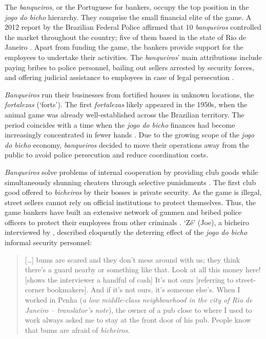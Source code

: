 \documentclass[a4paper,12pt]{article}
\begin{document}
The \textit{banqueiros}, or the Portuguese for bankers, occupy the top position in the \textit{jogo do bicho} hierarchy. They comprise the small financial elite of the game. A 2012 report by the Brazilian Federal Police affirmed that 10 \textit{banqueiros} controlled the market throughout the country; five of them based in the state of Rio de Janeiro \citep{globo2012contraventores}. Apart from funding the game, the bankers provide support for the employees to undertake their activities. The \textit{banqueiros}' main attributions include paying bribes to police personnel, bailing out sellers arrested by security forces, and offering judicial assistance to employees in case of legal persecution \citep[75]{labronici2012paratodos}.

\textit{Banqueiros} run their businesses from fortified houses in unknown locations, the \textit{fortalezas} (`forts'). The first \textit{fortalezas} likely appeared in the 1950s, when the animal game was already well-established across the Brazilian territory. The period coincides with a time when the \textit{jogo do bicho} finances had become increasingly concentrated in fewer hands \citep[259]{chazkel2011laws}. Due to the growing scope of the \textit{jogo do bicho} economy, \textit{banqueiros} decided to move their operations away from the public to avoid police persecution and reduce coordination costs.

\textit{Banqueiros} solve problems of internal cooperation by providing club goods \citep{buchanan1965economic} while simultaneously shunning cheaters through selective punishments \citep{bo2005cooperation, roth1978equilibrium}. The first club good offered to \textit{bicheiros} by their bosses is private security. As the game is illegal, street sellers cannot rely on official institutions to protect themselves. Thus, the game bankers have built an extensive network of gunmen and bribed police officers to protect their employees from other criminals \citetext{\citealp[48]{chinelli1993vazio}; \citealp[51]{labronici2012paratodos}}. `Zé' (Joe), a bicheiro interviewed by \citet[52]{labronici2012paratodos}, described eloquently the deterring effect of the \emph{jogo do bicho} informal security personnel:

\begin{quote}
 [\dots] bums are scared and they don't mess around with us; they think there's a guard nearby or something like that. Look at all this money here! [shows the interviewer a handful of cash] It's not ours [referring to street-corner bookmakers]. And if it's not ours, it's someone else's. When I worked in Penha (\emph{a low middle-class neighbourhood in the city of Rio de Janeiro -- translator's note}), the owner of a pub close to where I used to work always asked me to stay at the front door of his pub. People know that bums are afraid of \emph{bicheiros}.
\end{quote}
\end{document}

